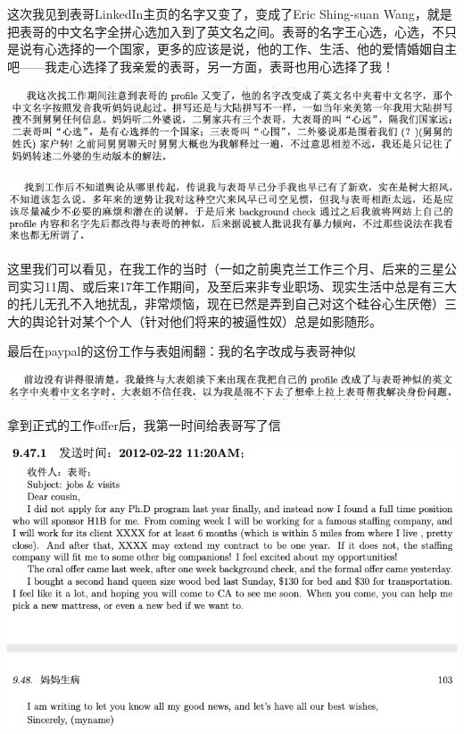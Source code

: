 \documentclass[9pt, b5paper]{article}
\begin{document}
这次我见到表哥LinkedIn主页的名字又变了，变成了Eric Shing-suan Wang，就是把表哥的中文名字全拼心选加入到了英文名之间。表哥的名字王心选，心选，不只是说有心选择的一个国家，更多的应该是说，他的工作、生活、他的爱情婚姻自主吧——我走心选择了我亲爱的表哥，另一方面，表哥也用心选择了我！

\begin{center}
\includegraphics[width=.9\linewidth]{./pic/p1p102-2.png}
\end{center}

\begin{center}
\includegraphics[width=.9\linewidth]{./pic/p1p102-3.png}
\end{center}

这里我们可以看见，在我工作的当时（一如之前奥克兰工作三个月、后来的三星公司实习11周、或后来17年工作期间，及至后来非专业职场、现实生活中总是有三大的托儿无孔不入地扰乱，非常烦恼，现在已然是弄到自己对这个硅谷心生厌倦）三大的舆论针对某个个人（针对他们将来的被逼性奴）总是如影随形。

最后在paypal的这份工作与表姐闹翻：我的名字改成与表哥神似

\begin{center}
\includegraphics[width=.9\linewidth]{./pic/p1p123-2.png}
\end{center}

拿到正式的工作offer后，我第一时间给表哥写了信

\begin{center}
\includegraphics[width=.9\linewidth]{./pic/p1p103.png}
\end{center}
\end{document}
